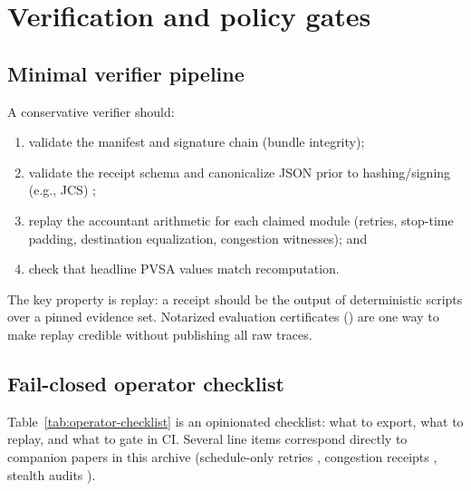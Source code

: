 \documentclass[11pt]{article}
\begin{document}
\section{Verification and policy gates}
\subsection{Minimal verifier pipeline}
A conservative verifier should:
\begin{enumerate}[leftmargin=1.4em]
\item validate the manifest and signature chain (bundle integrity);
\item validate the receipt schema and canonicalize JSON prior to hashing/signing (e.g., JCS) \cite{rfc8785};
\item replay the accountant arithmetic for each claimed module (retries, stop-time padding, destination equalization, congestion witnesses); and
\item check that headline PVSA values match recomputation.
\end{enumerate}
The key property is replay: a receipt should be the output of deterministic scripts over a pinned evidence set.
Notarized evaluation certificates (\cite{series:evalnotary}) are one way to make replay credible without publishing all raw traces.

\subsection{Fail-closed operator checklist}
Table~\ref{tab:operator-checklist} is an opinionated checklist: what to export, what to replay, and what to gate in CI.
Several line items correspond directly to companion papers in this archive (schedule-only retries \cite{series:schedretries}, congestion receipts \cite{series:wcongeq}, stealth audits \cite{series:advantagecontracts}).
\end{document}
